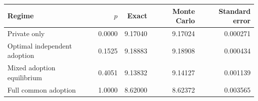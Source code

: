 \begin{tabular}{lrrrr}
\toprule
Regime & $p$ & Exact & Monte Carlo & Standard error\\
\midrule
Private only & 0.0000 & 9.17040 & 9.17024 & 0.000271 \\
Optimal independent adoption & 0.1525 & 9.18883 & 9.18908 & 0.000434 \\
Mixed adoption equilibrium & 0.4051 & 9.13832 & 9.14127 & 0.001139 \\
Full common adoption & 1.0000 & 8.62000 & 8.62372 & 0.003565 \\
\bottomrule
\end{tabular}
